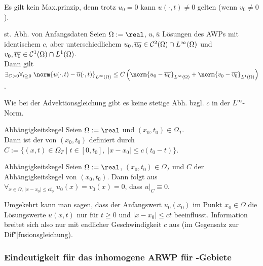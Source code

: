 \begin{Bem}
    Es gilt kein Max.prinzip, denn trotz $u_0 = 0$ kann $u(\cdot, t) \not= 0$ gelten
    (wenn $v_0 \not= 0$).
\end{Bem}

\begin{Satz}{st. Abh. von Anfangsdaten}
    Seien $\Omega := \real$, $u, \overline{u}$ Lösungen des AWPs mit identischem $c$,
    aber unterschiedlichem $u_0, \overline{u_0} \in \mathcal{C}^2(\Omega) \cap L^\infty(\Omega)$ und
    $v_0, \overline{v_0} \in \mathcal{C}^1(\Omega) \cap L^1(\Omega)$.\\
    Dann gilt $\exists_{C > 0} \forall_{t \ge 0}\;
    \norm{u(\cdot, t) - \overline{u}(\cdot, t)}_{L^\infty(\Omega)}
    \le C \left(\norm{u_0 - \overline{u_0}}_{L^\infty(\Omega)} +
    \norm{v_0 - \overline{v_0}}_{L^1(\Omega)}\right)$.
\end{Satz}

\begin{Bem}
    Wie bei der Advektionsgleichung gibt es keine stetige Abh. bzgl. $c$ in der
    $L^\infty$-Norm.
\end{Bem}

\linie

\begin{Def}{Abhängigkeitskegel}
    Seien $\Omega := \real$ und $(x_0, t_0) \in \Omega_T$.\\
    Dann ist der  von $(x_0, t_0)$ definiert
    durch\\
    $C := \{(x, t) \in \Omega_T \;|\; t \in [0, t_0],\; |x - x_0| \le c(t_0 - t)\}$.
\end{Def}

\begin{Satz}{Abhängigkeitskegel}
    Seien $\Omega := \real$, $(x_0, t_0) \in \Omega_T$ und $C$ der Abhängigkeitskegel von
    $(x_0, t_0)$.
    Dann folgt aus $\forall_{x \in \Omega,\, |x - x_0| \le ct_0}\; u_0(x) = v_0(x) = 0$,
    dass $u|_C \equiv 0$.
\end{Satz}

\begin{Bem}
    Umgekehrt kann man sagen, dass der Anfangswert $u_0(x_0)$ im Punkt $x_0 \in \Omega$ die
    Lösungswerte $u(x, t)$ nur für $t \ge 0$ und $|x - x_0| \le ct$ beeinflusst.
    Information breitet sich also nur mit endlicher Geschwindigkeit $c$ aus
    (im Gegensatz zur Dif"|fusionsgleichung).
\end{Bem}

\subsubsection{%
    Eindeutigkeit für das inhomogene ARWP für -Gebiete%
}

